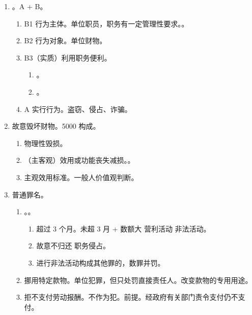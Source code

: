 \begin{enumerate}
\begin{enumerate}
\begin{enumerate}
                \end{enumerate}
          \item vs 侵占。。考出借行为，看出借是否会失去占有。
                \begin{enumerate}
                  \item {}。
                  \item {}。
                \end{enumerate}
        \end{enumerate}
  \item {}。A + B。
        \begin{enumerate}
          \item B1 行为主体。单位职员，职务有一定管理性要求。。
          \item B2 行为对象。单位财物。
          \item B3（实质）利用职务便利。
                \begin{enumerate}
                  \item {}。
                  \item {}。
                \end{enumerate}
          \item A 实行行为。盗窃、侵占、诈骗。
        \end{enumerate}
  \item 故意毁坏财物。5000 构成。
        \begin{enumerate}
          \item 物理性毁损。
          \item （主客观）效用或功能丧失减损。。
          \item 主观效用标准。一般人价值观判断。
        \end{enumerate}
  \item 普通罪名。
        \begin{enumerate}
          \item {}。。
                \begin{enumerate}
                  \item 超过 3 个月。未超 3 月 + 数额大 \hz 营利活动 \hz 非法活动。
                  \item 故意不归还 \yjt 职务侵占。
                  \item 进行非法活动构成其他罪的，数罪并罚。
                \end{enumerate}
          \item 挪用特定款物。\yi 单位犯罪，但只处罚直接责任人。\er 改变款物的专用用途。
          \item 拒不支付劳动报酬。\yi 不作为犯。\er 前提。经政府有关部门责令支付仍不支付。
        \end{enumerate}
\end{enumerate}
